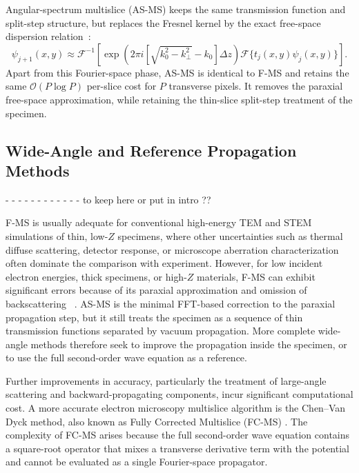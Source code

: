 \documentclass[preprint,12pt,number]{elsarticle}
\begin{document}
Angular-spectrum multislice (AS-MS) keeps the same transmission function and
split-step structure, but replaces the Fresnel kernel by the exact free-space
dispersion relation~\cite{goodman,ming2013pcms}:
\begin{equation}
\psi_{j+1}(x,y)
\approx
\mathcal F^{-1}
\left[
\exp\left(2\pi i\left[\sqrt{k_0^2-k_\perp^2}-k_0\right]\Delta z\right)
\mathcal F\{t_j(x,y)\psi_j(x,y)\}
\right].
\label{eq:asm_step}
\end{equation}
Apart from this Fourier-space phase, AS-MS is identical to F-MS and retains the
same $\mathcal O(P\log P)$ per-slice cost for $P$ transverse pixels. It removes
the paraxial free-space approximation, while retaining the thin-slice
split-step treatment of the specimen.

\subsection{Wide-Angle and Reference Propagation Methods}
\label{sec:advanced_propagation_methods}
- - - - - - - - - - - - to keep here or put in intro ?? 


F-MS is usually adequate for conventional high-energy TEM and STEM simulations
of thin, low-$Z$ specimens, where other uncertainties such as thermal diffuse
scattering, detector response, or microscope aberration characterization often
dominate the comparison with experiment. However, for low incident electron
energies, thick specimens, or high-$Z$ materials, F-MS can exhibit significant
errors because of its paraxial approximation and omission of backscattering
~\cite{RotherScheerschmidt2009,hillier_role_2017,WackerSchroeder2015,ming2013pcms}.
AS-MS is the minimal FFT-based correction to the paraxial propagation step, but
it still treats the specimen as a sequence of thin transmission functions
separated by vacuum propagation. More complete wide-angle methods therefore
seek to improve the propagation inside the specimen, or to use the full
second-order wave equation as a reference.

Further improvements in accuracy, particularly the treatment of large-angle
scattering and backward-propagating components, incur significant computational
cost. A more accurate electron microscopy multislice algorithm is the
Chen--Van Dyck method, also known as Fully Corrected Multislice (FC-MS) \cite{ming2013pcms,ChenVanDyck1997}. The complexity 
of FC-MS arises because the full second-order wave equation contains a
square-root operator that mixes a transverse derivative term with the potential
and cannot be evaluated as a single Fourier-space propagator.
\end{document}
